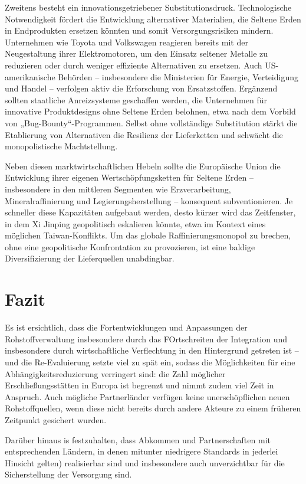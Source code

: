 \documentclass[12pt,a4paper,oneside]{book} %
\begin{document}
Zweitens besteht ein innovationsgetriebener Substitutionsdruck. Technologische Notwendigkeit fördert die Entwicklung alternativer Materialien, die Seltene Erden in Endprodukten ersetzen könnten und somit Versorgungsrisiken mindern. Unternehmen wie Toyota und Volkswagen reagieren bereits mit der Neugestaltung ihrer Elektromotoren, um den Einsatz seltener Metalle zu reduzieren oder durch weniger effiziente Alternativen zu ersetzen. Auch US-amerikanische Behörden – insbesondere die Ministerien für Energie, Verteidigung und Handel – verfolgen aktiv die Erforschung von Ersatzstoffen. Ergänzend sollten staatliche Anreizsysteme geschaffen werden, die Unternehmen für innovative Produktdesigns ohne Seltene Erden belohnen, etwa nach dem Vorbild von „Bug-Bounty“-Programmen. Selbst ohne vollständige Substitution stärkt die Etablierung von Alternativen die Resilienz der Lieferketten und schwächt die monopolistische Machtstellung.

Neben diesen marktwirtschaftlichen Hebeln sollte die Europäische Union die Entwicklung ihrer eigenen Wertschöpfungsketten für Seltene Erden – insbesondere in den mittleren Segmenten wie Erzverarbeitung, Mineralraffinierung und Legierungsherstellung – konsequent subventionieren. Je schneller diese Kapazitäten aufgebaut werden, desto kürzer wird das Zeitfenster, in dem Xi Jinping geopolitisch eskalieren könnte, etwa im Kontext eines möglichen Taiwan-Konflikts. Um das globale Raffinierungsmonopol zu brechen, ohne eine geopolitische Konfrontation zu provozieren, ist eine baldige Diversifizierung der Lieferquellen unabdingbar.

\section{Fazit}

Es ist ersichtlich, dass die Fortentwicklungen und Anpassungen der Rohstoffverwaltung insbesondere durch das FOrtschreiten der Integration und insbesondere durch wirtschaftliche Verflechtung in den Hintergrund getreten ist -- und die Re-Evaluierung setzte viel zu spät ein, sodass die Möglichkeiten für eine Abhängigkeitsreduzierung verringert sind: die Zahl möglicher Erschließungsstätten in Europa ist begrenzt und nimmt zudem viel Zeit in Anspruch. Auch mögliche Partnerländer verfügen keine unerschöpflichen neuen Rohstoffquellen, wenn diese nicht bereits durch andere Akteure zu einem früheren Zeitpunkt gesichert wurden.

Darüber hinaus is festzuhalten, dass Abkommen und Partnerschaften mit entsprechenden Ländern, in denen mitunter niedrigere Standards in jederlei Hinsicht gelten) realisierbar sind und insbesondere auch unverzichtbar für die Sicherstellung der Versorgung sind.
\end{document}
